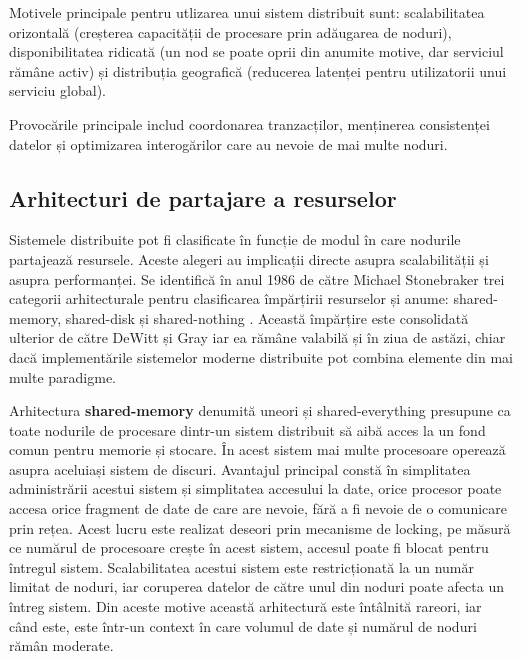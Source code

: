 Motivele principale pentru utlizarea unui sistem distribuit sunt: scalabilitatea orizontală (creșterea capacității de procesare prin adăugarea de noduri), disponibilitatea ridicată (un nod se poate oprii din anumite motive, dar serviciul rămâne activ) și distribuția geografică (reducerea latenței pentru utilizatorii unui serviciu global).

Provocările principale includ coordonarea tranzacților, menținerea consistenței datelor și optimizarea interogărilor care au nevoie de mai multe noduri.

\subsection{Arhitecturi de partajare a resurselor}

Sistemele distribuite pot fi clasificate în funcție de modul în care nodurile partajează resursele. Aceste alegeri au implicații directe asupra scalabilității și asupra performanței. Se identifică în anul 1986 de către Michael Stonebraker trei categorii arhitecturale pentru clasificarea împărțirii resurselor și anume: shared-memory, shared-disk și shared-nothing \cite{stonebraker1986}. Această împărțire este consolidată ulterior de către DeWitt și Gray \cite{dewitt1992} iar ea rămâne valabilă și în ziua de astăzi, chiar dacă implementările sistemelor moderne distribuite pot combina elemente din mai multe paradigme.

Arhitectura \textbf{shared-memory} denumită uneori și shared-everything presupune ca toate nodurile de procesare dintr-un sistem distribuit să aibă acces la un fond comun pentru memorie și stocare. În acest sistem mai multe procesoare operează asupra aceluiași sistem de discuri. Avantajul principal constă în simplitatea administrării acestui sistem și simplitatea accesului la date, orice procesor poate accesa orice fragment de date de care are nevoie, fără a fi nevoie de o comunicare prin rețea. Acest lucru este realizat deseori prin mecanisme de locking, pe măsură ce numărul de procesoare crește în acest sistem, accesul poate fi blocat pentru întregul sistem. Scalabilitatea acestui sistem este restricționată la un număr limitat de noduri, iar coruperea datelor de către unul din noduri poate afecta un întreg sistem. Din aceste motive această arhitectură este întâlnită rareori, iar când este, este într-un context în care volumul de date și numărul de noduri rămân moderate.

